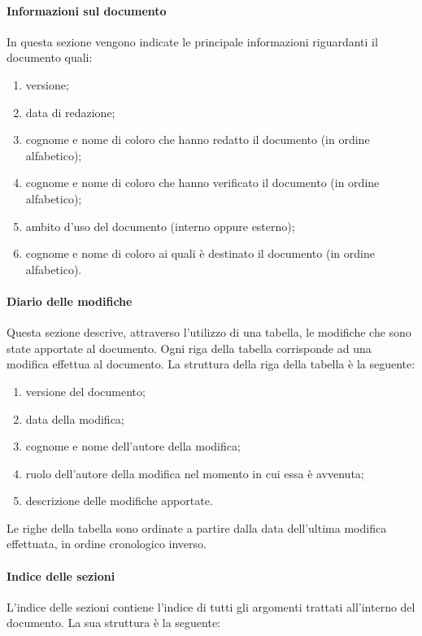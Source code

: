 \documentclass[../NormeProgetto.text]{subfiles}
\begin{document}
		\paragraph{Informazioni sul documento}
			In questa sezione vengono indicate le principale informazioni riguardanti il documento quali:
			\begin{enumerate}
				\item versione;
				\item data di redazione;
				\item cognome e nome di coloro che hanno redatto il documento (in ordine alfabetico);
				\item cognome e nome di coloro che hanno verificato il documento (in ordine alfabetico);
				\item ambito d'uso del documento (interno oppure esterno);
				\item cognome e nome di coloro ai quali è destinato il documento (in ordine alfabetico).
			\end{enumerate}

		\paragraph{Diario delle modifiche}
			Questa sezione descrive, attraverso l'utilizzo di una tabella, le modifiche che sono state apportate al documento. Ogni riga della tabella corrisponde ad una modifica effettua al documento. La struttura della riga della tabella è la seguente:
			\begin{enumerate}
				\item versione del documento;
				\item data della modifica;
				\item cognome e nome dell'autore della modifica;
				\item ruolo dell'autore della modifica nel momento in cui essa è avvenuta;
				\item descrizione delle modifiche apportate.
			\end{enumerate}

			Le righe della tabella sono ordinate a partire dalla data dell'ultima modifica effettuata, in ordine cronologico inverso.

		\paragraph{Indice delle sezioni}
			L'indice delle sezioni contiene l'indice di tutti gli argomenti trattati all'interno del documento. La sua struttura è la seguente:
\end{document}
